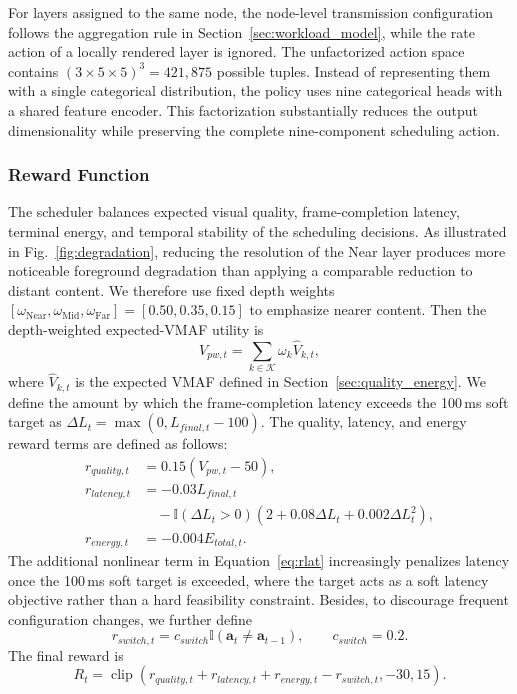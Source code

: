 \documentclass[10pt,journal,compsoc]{IEEEtran}
\begin{document}
For layers assigned to the same node, the node-level transmission configuration follows the aggregation rule in Section~\ref{sec:workload_model}, while the rate action of a locally rendered layer is ignored. The unfactorized action space contains $(3\times5\times5)^3=421{,}875$ possible tuples. Instead of representing them with a single categorical distribution, the policy uses nine categorical heads with a shared feature encoder. This factorization substantially reduces the output dimensionality while preserving the complete nine-component scheduling action.

\subsubsection{Reward Function}
\label{sec:reward}

The scheduler balances expected visual quality, frame-completion latency, terminal energy, and temporal stability of the scheduling decisions. As illustrated in Fig.~\ref{fig:degradation}, reducing the resolution of the Near layer produces more noticeable foreground degradation than applying a comparable reduction to distant content. We therefore use fixed depth weights $[\omega_{\mathrm{Near}},\omega_{\mathrm{Mid}},\omega_{\mathrm{Far}}]=[0.50,0.35,0.15]$ to emphasize nearer content. Then the depth-weighted expected-VMAF utility is
\begin{equation}
	V_{pw,t}=\sum_{k\in\mathcal{K}}\omega_k\widehat V_{k,t},
	\label{eq:vpw_model}
\end{equation}
where $\widehat V_{k,t}$ is the expected VMAF defined in Section~\ref{sec:quality_energy}. We define the amount by which the frame-completion latency exceeds the 100\,ms soft target as $\Delta L_t=\max(0,L_{final,t}-100)$. The quality, latency, and energy reward terms are defined as follows:
\begin{align}
	r_{quality,t} &= 0.15(V_{pw,t}-50), \label{eq:rqual}\\
	r_{latency,t} &= -0.03L_{final,t} \nonumber\\
	&\quad -\mathbb{I}(\Delta L_t>0)
	\left(2+0.08\Delta L_t+0.002\Delta L_t^2\right), \label{eq:rlat}\\
	r_{energy,t} &= -0.004E_{total,t}.
\end{align}
The additional nonlinear term in Equation~\ref{eq:rlat} increasingly penalizes latency once the 100\,ms soft target is exceeded, where the target acts as a soft latency objective rather than a hard feasibility constraint. Besides, to discourage frequent configuration changes, we further define
\begin{equation}
	r_{switch,t}=c_{switch}\mathbb{I}\!\left(\mathbf{a}_t\neq\mathbf{a}_{t-1}\right),
	\qquad c_{switch}=0.2.
	\label{eq:rswitch}
\end{equation}
The final reward is
\begin{equation}
	R_t=\operatorname{clip}
	(r_{quality,t}+r_{latency,t}+r_{energy,t}-r_{switch,t},-30,15).
	\label{eq:reward}
\end{equation}
\end{document}
